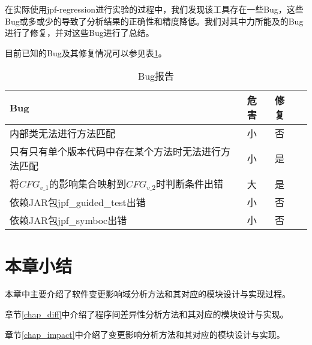 在实际使用jpf-regression进行实验的过程中，我们发现该工具存在一些Bug，这些Bug或多或少的导致了分析结果的正确性和精度降低。我们对其中力所能及的Bug进行了修复，并对这些Bug进行了总结。

目前已知的Bug及其修复情况可以参见表\ref {bug_data}。

\begin{table}
	\caption{Bug报告}
	\label{bug_data}
	\centering
	\begin{tabular}{lllc}
		\toprule[1.5pt]
		{\heiti Bug} &{\heiti 危害} & {\heiti 修复} \\\midrule[1pt]
		内部类无法进行方法匹配 & 小 & 否\\
		只有只有单个版本代码中存在某个方法时无法进行方法匹配 & 小 & 是\\
		将$CFG_{v\_1}$的影响集合映射到$CFG_{v\_2}$时判断条件出错 & 大 & 是\\
		依赖JAR包jpf\_guided\_test出错 & 小 & 否\\
		依赖JAR包jpf\_symboc出错 & 小 & 否\\
		\bottomrule[1.5pt]
	\end{tabular}
\end{table}

\section{本章小结}

本章中主要介绍了软件变更影响域分析方法和其对应的模块设计与实现过程。

章节\ref {chap_diff}中介绍了程序间差异性分析方法和其对应的模块设计与实现。

章节\ref {chap_impact}中介绍了变更影响分析方法和其对应的模块设计与实现。
